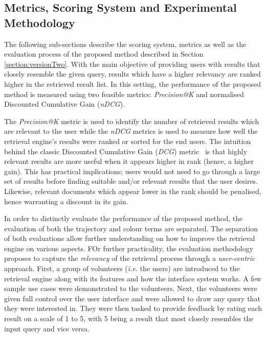 \subsection{Metrics, Scoring System and Experimental Methodology}
\label{sec:retrieval-metrics}
The following sub-sections describe the scoring system, metrics as well as the evaluation process of the proposed method described in Section \ref{section:versionTwo}. With the main objective of providing users with results that closely resemble the given query, results which have a higher relevancy are ranked higher in the retrieved result list. In this setting, the performance of the proposed method is measured using two feasible metrics: \textit{Precision@K} and normalised Discounted Cumulative Gain (\textit{nDCG}).

The \textit{Precision@K} metric is used to identify the number of retrieved results which are relevant to the user while the \textit{nDCG} metrics is used to measure how well the retrieval engine's results were ranked or sorted for the end
users. The intuition behind the classic Discounted Cumulative Gain (\textit{DCG}) metric~\cite{jarvelin2002cumulated} is that highly relevant results are more useful when it appears higher in rank (hence, a higher gain). This has practical implications; users would not need to go through a large set of results before finding suitable and/or relevant results that the user desires. Likewise, relevant documents which appear lower in the rank should be penalised, hence warranting a discount in its gain.

In order to distinctly evaluate the performance of the proposed method, the evaluation of both the trajectory and colour terms are separated. The separation of both evaluations allow further understanding on how to improve the retrieval engine on various aspects. FOr further practicality, the evaluation methodology proposes to capture the \emph{relevancy} of the retrieval process through a \emph{user-centric} approach. First, a group of volunteers (\emph{i.e.} the users) are introduced to the retrieval engine along with its features and how the interface system works. A few sample use cases were demonstrated to the volunteers. Next, the volunteers were given full control over the user interface and were allowed to draw any query that they were interested in. They were then tasked to provide feedback by rating each result on a scale of 1 to 5, with 5 being a result that most closely resembles the input query and vice versa.

